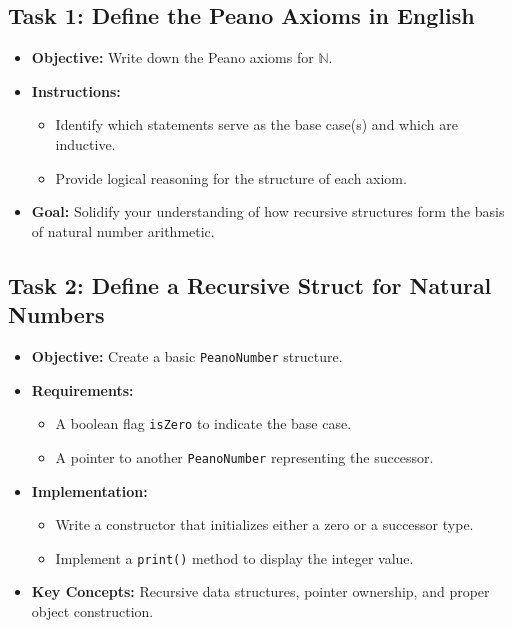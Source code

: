 \documentclass[12pt]{article}
\begin{document}
\subsection*{Task 1: Define the Peano Axioms in English}
\begin{itemize}[leftmargin=*]
    \item \textbf{Objective:} Write down the Peano axioms for $\mathbb{N}$.
    \item \textbf{Instructions:}
    \begin{itemize}
        \item Identify which statements serve as the base case(s) and which are inductive.
        \item Provide logical reasoning for the structure of each axiom.
    \end{itemize}
    \item \textbf{Goal:} Solidify your understanding of how recursive structures form the basis of natural number arithmetic.
\end{itemize}

\subsection*{Task 2: Define a Recursive Struct for Natural Numbers}
\begin{itemize}[leftmargin=*]
    \item \textbf{Objective:} Create a basic \texttt{PeanoNumber} structure.
    \item \textbf{Requirements:}
    \begin{itemize}
        \item A boolean flag \texttt{isZero} to indicate the base case.
        \item A pointer to another \texttt{PeanoNumber} representing the successor.
    \end{itemize}
    \item \textbf{Implementation:}
    \begin{itemize}
        \item Write a constructor that initializes either a zero or a successor type.
        \item Implement a \texttt{print()} method to display the integer value.
    \end{itemize}
    \item \textbf{Key Concepts:} Recursive data structures, pointer ownership, and proper object construction.
\end{itemize}
\end{document}
